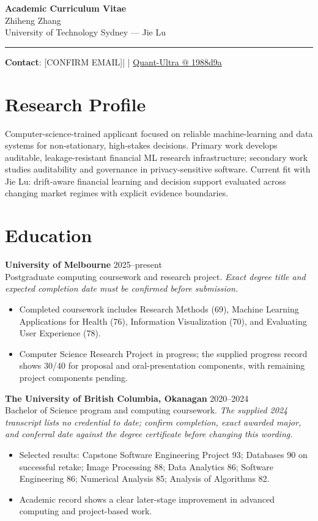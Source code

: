 \documentclass[11pt]{article}
\makeatletter
\newcommand{\ApplicantName}{Zhiheng Zhang}
\newcommand{\ApplicantEmail}{[CONFIRM EMAIL]}
\newcommand{\ApplicantPhone}{[CONFIRM PHONE]}
\newcommand{\ApplicantGitHub}{\href{https://github.com/zhiheng-zhang-Mera/Quant-Ultra/tree/1988d9a8530da91a8158de864d098ea869098923}{Quant-Ultra @ 1988d9a}}
\makeatother
\begin{document}
\begin{center}
{\LARGE\bfseries Academic Curriculum Vitae}\\[0.25em]
{\large \ApplicantName}\\
University of Technology Sydney --- Jie Lu
\end{center}
\vspace{0.35em}\hrule\vspace{0.65em}

\textbf{Contact}: \ApplicantEmail\quad | \quad \ApplicantPhone\quad | \quad \ApplicantGitHub

\section*{Research Profile}
Computer-science-trained applicant focused on reliable machine-learning and data systems for non-stationary, high-stakes decisions. Primary work develops auditable, leakage-resistant financial ML research infrastructure; secondary work studies auditability and governance in privacy-sensitive software. Current fit with Jie Lu: drift-aware financial learning and decision support evaluated across changing market regimes with explicit evidence boundaries.

\section*{Education}
\textbf{University of Melbourne} \hfill 2025--present\\
Postgraduate computing coursework and research project. \textit{Exact degree title and expected completion date must be confirmed before submission.}
\begin{itemize}
\item Completed coursework includes Research Methods (69), Machine Learning Applications for Health (76), Information Visualization (70), and Evaluating User Experience (78).
\item Computer Science Research Project in progress; the supplied progress record shows 30/40 for proposal and oral-presentation components, with remaining project components pending.
\end{itemize}

\textbf{The University of British Columbia, Okanagan} \hfill 2020--2024\\
Bachelor of Science program and computing coursework. \textit{The supplied 2024 transcript lists no credential to date; confirm completion, exact awarded major, and conferral date against the degree certificate before changing this wording.}
\begin{itemize}
\item Selected results: Capstone Software Engineering Project 93; Databases 90 on successful retake; Image Processing 88; Data Analytics 86; Software Engineering 86; Numerical Analysis 85; Analysis of Algorithms 82.
\item Academic record shows a clear later-stage improvement in advanced computing and project-based work.
\end{itemize}
\end{document}
